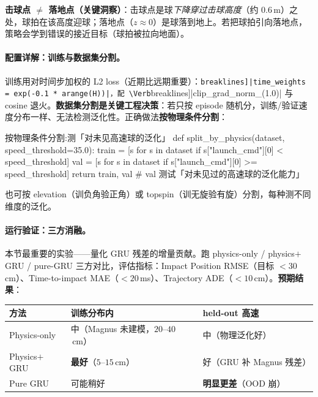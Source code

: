 \textbf{击球点 $\neq$ 落地点（关键洞察）}：击球点是球\emph{下降穿过击球高度}（约 $0.6$\,m）之处，球拍在该高度迎球；落地点（$z\approx 0$）是球落到地上。若把球拍引向落地点，策略会学到错误的接近目标（球拍被拉向地面）。

\paragraph{配置详解：训练与数据集分割。}训练用对时间步加权的 L2 loss（近期比远期重要）：\Verb[breaklines]|time_weights = exp(-0.1 * arange(H))|，配 \Verb[breaklines]|clip_grad_norm_(1.0)| 与 cosine 退火。\textbf{数据集分割是关键工程决策}：若只按 episode 随机分，训练/验证速度分布一样、无法检测泛化性。正确做法\textbf{按物理条件分割}：

\begin{codebox}[Python]{按物理条件分割:测「对未见高速球的泛化」}
def split_by_physics(dataset, speed_threshold=35.0):
    train = [s for s in dataset if s["launch_cmd"][0] <  speed_threshold]
    val   = [s for s in dataset if s["launch_cmd"][0] >= speed_threshold]
    return train, val      # val 测试「对未见过的高速球的泛化能力」
\end{codebox}

也可按 elevation（训负角验正角）或 topspin（训无旋验有旋）分割，每种测不同维度的泛化。

\paragraph{运行验证：三方消融。}本节最重要的实验——量化 GRU 残差的增量贡献。跑 physics-only / physics$+$GRU / pure-GRU 三方对比，评估指标：Impact Position RMSE（目标 $<30$\,cm）、Time-to-impact MAE（$<20$\,ms）、Trajectory ADE（$<10$\,cm）。\textbf{预期结果}：

\begin{center}
\small
\begin{tabular}{@{}lll@{}}
\toprule
方法 & 训练分布内 & held-out 高速 \\
\midrule
Physics-only & 中（Magnus 未建模，$20$--$40$\,cm） & 中（物理泛化好） \\
Physics$+$GRU & \textbf{最好}（$5$--$15$\,cm） & 好（GRU 补 Magnus 残差） \\
Pure GRU & 可能稍好 & \textbf{明显更差}（OOD 崩） \\
\bottomrule
\end{tabular}
\end{center}


